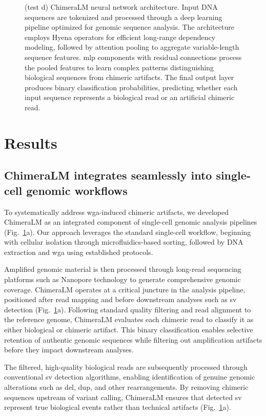 \documentclass[pdflatex,sn-nature]{sn-jnl}%
\theoremstyle{thmstyleone}%
\theoremstyle{thmstyletwo}%
\theoremstyle{thmstylethree}%
\begin{document}
\begin{figure}[p]
{        (test d) ChimeraLM neural network architecture. Input DNA sequences are tokenized and processed through a deep learning pipeline optimized for genomic sequence analysis. The architecture employs Hyena operators for efficient long-range dependency modeling, followed by attention pooling to aggregate variable-length sequence features. \gls{mlp} components with residual connections process the pooled features to learn complex patterns distinguishing biological sequences from chimeric artifacts. The final output layer produces binary classification probabilities, predicting whether each input sequence represents a biological read or an artificial chimeric read.} \label{fig:figure1}
\end{figure}

\section*{Results}\label{sec:results}

\subsection*{ChimeraLM integrates seamlessly into single-cell genomic workflows}

To systematically address \gls{wga}-induced chimeric artifacts, we developed ChimeraLM as an integrated component of single-cell genomic analysis pipelines (Fig.~\ref{fig:figure1}a).
Our approach leverages the standard single-cell workflow, beginning with cellular isolation through microfluidics-based sorting, followed by DNA extraction and \gls{wga} using established protocols.

Amplified genomic material is then processed through long-read sequencing platforms such as Nanopore technology to generate comprehensive genomic coverage.
ChimeraLM operates at a critical juncture in the analysis pipeline, positioned after read mapping and before downstream analyses such as \gls{sv} detection (Fig.~\ref{fig:figure1}a).
Following standard quality filtering and read alignment to the reference genome, ChimeraLM evaluates each chimeric read to classify it as either biological or chimeric artifact.
This binary classification enables selective retention of authentic genomic sequences while filtering out amplification artifacts before they impact downstream analyses.

The filtered, high-quality biological reads are subsequently processed through conventional \gls{sv} detection algorithms, enabling identification of genuine genomic alterations such as \gls{del}, \gls{dup}, and other rearrangements.
By removing chimeric sequences upstream of variant calling, ChimeraLM ensures that detected \gls{sv} represent true biological events rather than technical artifacts (Fig.~\ref{fig:figure1}a).
\end{document}
